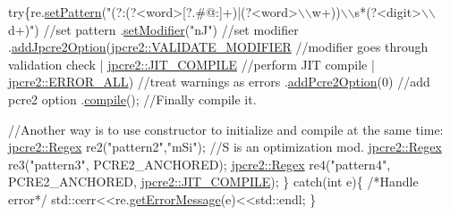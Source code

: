 \begin{DoxyCode}
\textcolor{keywordflow}{try}\{re.\hyperlink{classjpcre2_1_1Regex_a85d9a514ea86ae68533223adac6c6bd8}{setPattern}(\textcolor{stringliteral}{"(?:(?<word>[?.#@:]+)|(?<word>\(\backslash\)\(\backslash\)w+))\(\backslash\)\(\backslash\)s*(?<digit>\(\backslash\)\(\backslash\)d+)"})  \textcolor{comment}{//set pattern}
      .\hyperlink{classjpcre2_1_1Regex_aed9865b58c60945e19f36fa310f5a595}{setModifier}(\textcolor{stringliteral}{"nJ"})                                                    \textcolor{comment}{//set modifier}
      .\hyperlink{classjpcre2_1_1Regex_a03974fa7ba8f7c47186cb8d6f54934de}{addJpcre2Option}(\hyperlink{namespacejpcre2_a85c143271501e383843f45b9999c2f00a9124b768bcae4d51430aa7f26126f387}{jpcre2::VALIDATE\_MODIFIER}                   
               \textcolor{comment}{//modifier goes through validation check}
                        | \hyperlink{namespacejpcre2_a85c143271501e383843f45b9999c2f00a5e8bab7c478015b19baf3e84ed00876e}{jpcre2::JIT\_COMPILE}                               \textcolor{comment}{//perform
       JIT compile}
                        | \hyperlink{namespacejpcre2_a85c143271501e383843f45b9999c2f00a6fec35fc9fdd8a606bed430c1816c552}{jpcre2::ERROR\_ALL})                                \textcolor{comment}{//treat
       warnings as errors}
      .\hyperlink{classjpcre2_1_1Regex_a2c7dcf12f26b2b046e147b013c8b5087}{addPcre2Option}(0)                                                    \textcolor{comment}{//add pcre2
       option}
      .\hyperlink{classjpcre2_1_1Regex_aad1d5ef1e87f762f68a587eec4022e69}{compile}();                                                           \textcolor{comment}{//Finally compile it.}

    \textcolor{comment}{//Another way is to use constructor to initialize and compile at the same time:}
    \hyperlink{classjpcre2_1_1Regex}{jpcre2::Regex} re2(\textcolor{stringliteral}{"pattern2"},\textcolor{stringliteral}{"mSi"});  \textcolor{comment}{//S is an optimization mod.}
    \hyperlink{classjpcre2_1_1Regex}{jpcre2::Regex} re3(\textcolor{stringliteral}{"pattern3"}, PCRE2\_ANCHORED);
    \hyperlink{classjpcre2_1_1Regex}{jpcre2::Regex} re4(\textcolor{stringliteral}{"pattern4"}, PCRE2\_ANCHORED, 
      \hyperlink{namespacejpcre2_a85c143271501e383843f45b9999c2f00a5e8bab7c478015b19baf3e84ed00876e}{jpcre2::JIT\_COMPILE});
\}
\textcolor{keywordflow}{catch}(\textcolor{keywordtype}{int} e)\{
    \textcolor{comment}{/*Handle error*/}
    std::cerr<<re.\hyperlink{classjpcre2_1_1Regex_a92b75c438ccff871205b2175a6141fd5}{getErrorMessage}(e)<<std::endl;
\}
\end{DoxyCode}


